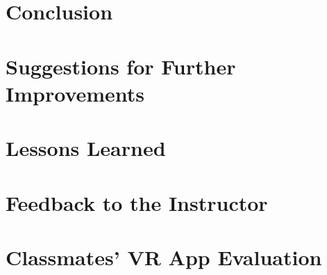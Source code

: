 \documentclass[12pt, twoside]{article}
\begin{document}
\section{Conclusion}
\section{Suggestions for Further Improvements}

\appendix
\section{Lessons Learned}
\section{Feedback to the Instructor}
\section{Classmates' VR App Evaluation}

    
\end{document}
